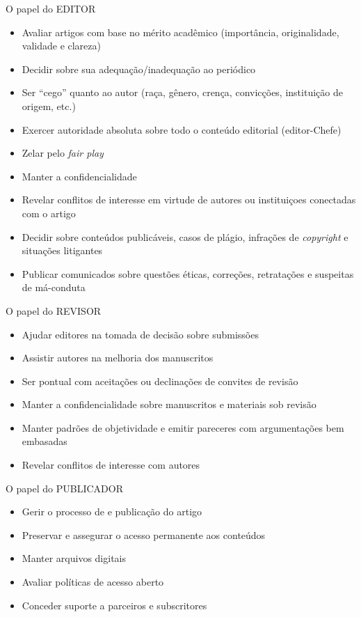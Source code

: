 \begin{frame}{O papel do EDITOR} 
\begin{itemize}
\item Avaliar artigos com base no mérito acadêmico (importância, originalidade, validade e clareza)
\item Decidir sobre sua adequação/inadequação ao periódico
\item Ser ``cego'' quanto ao autor (raça, gênero, crença, convicções, instituição de origem, etc.) 
\item Exercer autoridade absoluta sobre todo o conteúdo editorial (editor-Chefe)
\item Zelar pelo \textit{fair play}
\end{itemize}
\end{frame}

\begin{frame}
\begin{itemize}
\item Manter a confidencialidade
\item Revelar conflitos de interesse em virtude de autores ou instituiçoes conectadas com o artigo
\item Decidir sobre conteúdos publicáveis, casos de plágio, infrações de \textit{copyright} e situações litigantes
\item Publicar comunicados sobre questões éticas, correções, retratações e suspeitas de má-conduta
\end{itemize}
\end{frame}

\begin{frame}{O papel do REVISOR} 
\begin{itemize}
\item Ajudar editores na tomada de decisão sobre submissões
\item Assistir autores na melhoria dos manuscritos
\item Ser pontual com aceitações ou declinações de convites de revisão
\item Manter a confidencialidade sobre manuscritos e materiais sob revisão
\item Manter padrões de objetividade e emitir pareceres com argumentações bem embasadas
\item Revelar conflitos de interesse com autores
\end{itemize}
\end{frame}


\begin{frame}{O papel do PUBLICADOR} 
\begin{itemize}
\item Gerir o processo de  e publicação do artigo
\item Preservar e assegurar o acesso permanente aos conteúdos
\item Manter arquivos digitais
\item Avaliar políticas de acesso aberto
\item Conceder suporte a parceiros e subscritores
\end{itemize}
\end{frame}

